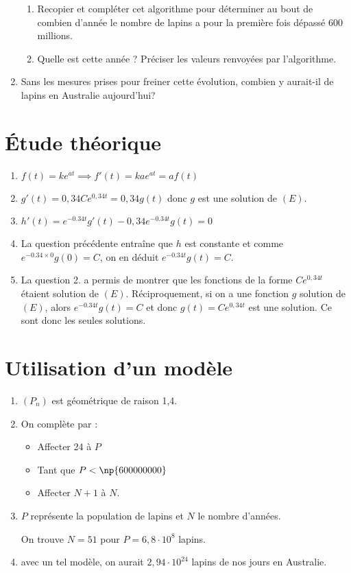 \documentclass[12pt,a4paper,french]{article}
\newcommand{\brm}[1]{\marginpar{\addpoints{#1}}}%
\begin{document}
\begin{question}
\begin{enumerate}
\begin{enumerate}
\item Recopier et compléter cet algorithme pour déterminer au bout de combien d'année le nombre de lapins a pour la première fois dépassé 600 millions. \brm{0.75}
\item Quelle est cette année ? Préciser les valeurs renvoyées par l'algorithme. \brm{0.25}
\end{enumerate}
\item Sans les mesures prises pour freiner cette évolution, combien y aurait-il de lapins en Australie aujourd'hui? \brm{0.5}
\end{enumerate}

\end{question}

\begin{solution}
  \section*{Étude théorique}
  \begin{enumerate}
    \item $f(t) = ke^{at} \implies f'(t) = kae^{at} = af(t)$
    \item $g'(t) = 0,34Ce^{0,34t} = 0,34g(t)$ donc $g$ est une solution
      de $(E)$.
    \item $h'(t) = e^{-0.34t} g'(t) - 0,34e^{-0.34t}g(t) = 0$
    \item La question précédente entraîne que $h$ est constante et comme
      $e^{-0.34\times 0}g(0) = C$, on en déduit $e^{-0.34t}g(t) = C$.
    \item La question 2. a permis de montrer que les fonctions de la
      forme $Ce^{0,34t}$ étaient solution de $(E)$. Réciproquement, si
      on a une fonction $g$ solution de $(E)$, alors $e^{-0.34t}g(t) =
      C$ et donc $g(t) = Ce^{0,34t}$ est une solution. Ce sont donc les
      seules solutions.
  \end{enumerate}
  \section*{Utilisation d'un modèle}
  \begin{enumerate}
    \item $(P_n)$ est géométrique de raison 1,4.
    \item On complète par :
      \begin{itemize}
        \item Affecter 24 à $P$
        \item Tant que $P < \np{600000000}$
        \item Affecter $N + 1$ à $N$.
      \end{itemize}
    \item $P$ représente la population de lapins et $N$ le nombre d'années.

      On trouve $N = 51$ pour $P = 6,8\cdot 10^{8}$ lapins.
    \item avec un tel modèle, on aurait $2,94\cdot 10^{24}$ lapins de
      nos jours en Australie.
  \end{enumerate}
\end{solution}
\end{document}

